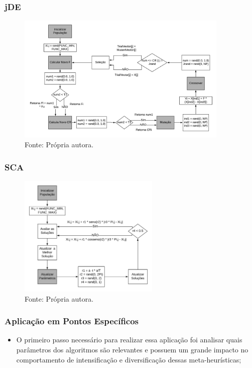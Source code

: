 \documentclass{beamer}
\newcommand{\source}[1]{\vspace{-6pt} \caption*{Fonte: {#1}} }
\begin{document}
\begin{frame}
\frametitle{jDE}
\begin{figure}[tbph]
\centering
\includegraphics[width=0.9\textwidth]{Diagrama_de_Blocos.png}
\source{Própria autora.}
\label{fig:jDE}
\end{figure}
\end{frame}

\begin{frame}
\frametitle{SCA}
\begin{figure}[tbph]
\centering
\includegraphics[width=0.6\textwidth]{Diagrama_SCA.png}
\source{Própria autora.}
\label{fig:SCA}
\end{figure}
\end{frame}

\begin{frame}
\frametitle{Aplicação em Pontos Específicos}
\begin{itemize}
    \item O primeiro passo necessário para realizar essa aplicação foi analisar quais parâmetros dos algoritmos são relevantes e possuem um grande impacto no comportamento de intensificação e diversificação dessas meta-heurísticas;
\end{itemize}
\end{frame}
\end{document}
